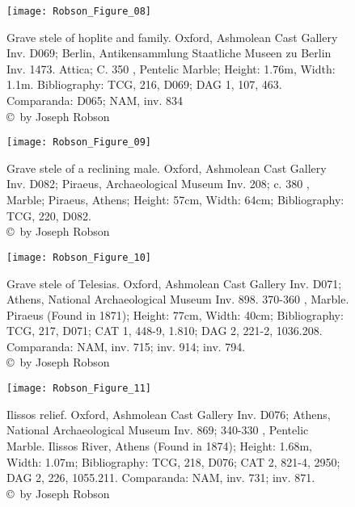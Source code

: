 \begin{figure}[!htb]
	\texttt{[image: Robson\_Figure\_08]}

	\caption{Grave stele of hoplite and family. Oxford, Ashmolean Cast Gallery Inv. D069; Berlin, Antikensammlung Staatliche Museen zu Berlin Inv. 1473. Attica; C. 350 \BC, Pentelic Marble; Height: 1.76m, Width: 1.1m. Bibliography: TCG, 216, D069; DAG 1, 107, 463.
		Comparanda: D065; NAM, inv. 834
		{\normalfont\scriptsize \\ \copyright\ by Joseph Robson}}
	\label{fig:Robson_Figure_08}
\end{figure}

\begin{figure}[!htb]
	\texttt{[image: Robson\_Figure\_09]}

	\caption{Grave stele of a reclining male. Oxford, Ashmolean Cast Gallery Inv. D082; Piraeus, Archaeological Museum Inv. 208; c. 380 \BC, Marble; Piraeus, Athens; Height: 57cm, Width: 64cm; Bibliography: TCG, 220, D082.
		{\normalfont\scriptsize \\ \copyright\ by Joseph Robson}}
	\label{fig:Robson_Figure_09}
\end{figure}

\begin{figure}[!htb]
	\texttt{[image: Robson\_Figure\_10]}

	\caption{Grave stele of Telesias. Oxford, Ashmolean Cast Gallery Inv. D071; Athens, National Archaeological Museum Inv. 898. 370-360 \BC, Marble. Piraeus (Found in 1871); Height: 77cm, Width: 40cm; Bibliography: TCG, 217, D071; CAT 1, 448-9, 1.810; DAG 2, 221-2, 1036.208.
		Comparanda: NAM, inv. 715; inv. 914; inv. 794.
		{\normalfont\scriptsize \\ \copyright\ by Joseph Robson}}
	\label{fig:Robson_Figure_10}
\end{figure}

\begin{figure}[!htb]
	\texttt{[image: Robson\_Figure\_11]}

	\caption{Ilissos relief. Oxford, Ashmolean Cast Gallery Inv. D076; Athens, National Archaeological Museum Inv. 869; 340-330 \BC, Pentelic Marble. Ilissos River, Athens (Found in 1874); Height: 1.68m, Width: 1.07m; Bibliography: TCG, 218, D076; CAT 2, 821-4, 2950; DAG 2, 226, 1055.211.
		Comparanda: NAM, inv. 731; inv. 871.
		{\normalfont\scriptsize \\ \copyright\ by Joseph Robson}}
	\label{fig:Robson_Figure_11}
\end{figure}

